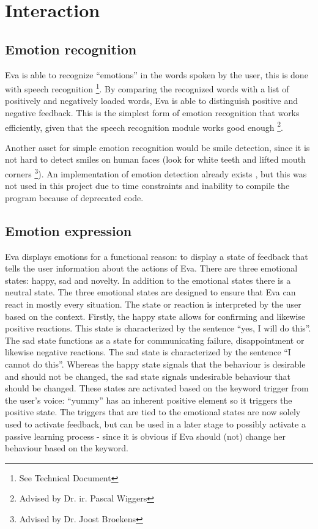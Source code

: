 \documentclass[project_eva.tex]{subfiles}
\begin{document}
\section*{Interaction}

\subsection*{Emotion recognition}
Eva is able to recognize ``emotions'' in the words spoken by the user, this is done with speech recognition \footnote{See 
Technical Document}. By comparing the recognized words with a list of positively and 
negatively loaded words, Eva is able to distinguish positive and negative feedback. This is the simplest form of emotion 
recognition that works efficiently, given that the speech recognition module works good enough \footnote{Advised by Dr. ir. 
Pascal Wiggers}. 

Another asset for simple emotion recognition would be smile detection, since it is not hard to detect smiles on human faces 
(look for white teeth and lifted mouth corners \footnote{Advised by Dr. Joost Broekens}). An implementation of emotion 
detection already exists \cite{autosmiley}, but this was not used in this project due to time 
constraints and inability to compile the program because of deprecated code.
 
\subsection*{Emotion expression}
\label{sec:Emotion expression}
Eva displays emotions for a functional reason: to display a state of feedback that tells the user information about the 
actions of Eva. There are three emotional states: happy, sad and novelty. In  addition to the emotional states there is a 
neutral state. The three emotional states are designed to ensure that Eva can react in mostly every situation. The state or 
reaction is interpreted by the user based on the context. Firstly, the happy  state allows for confirming and likewise 
positive reactions. This state is characterized by the sentence ``yes, I will do this''. The sad state functions as a state 
for communicating failure, disappointment or likewise negative reactions. The sad state is characterized by the sentence 
``I cannot do this''.  Whereas the happy state signals that the behaviour is desirable and should not be changed, the sad 
state signals undesirable behaviour that should be changed. These states are activated based on the keyword trigger from 
the user’s voice: ``yummy'' has an inherent positive element so it triggers the positive state. The triggers that are tied 
to the emotional states are now solely used to activate feedback, but can be used in a later stage to possibly activate a 
passive learning process - since it is obvious if Eva should (not) change her behaviour based on the keyword.
\end{document}
